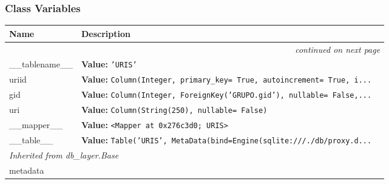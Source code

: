 
  \subsubsection{Class Variables}

    \vspace{-1cm}
\hspace{\varindent}\begin{longtable}{|p{\varnamewidth}|p{\vardescrwidth}|l}
\cline{1-2}
\cline{1-2} \centering \textbf{Name} & \centering \textbf{Description}& \\
\cline{1-2}
\endhead\cline{1-2}\multicolumn{3}{r}{\small\textit{continued on next page}}\\\endfoot\cline{1-2}
\endlastfoot\raggedright \_\-\_\-t\-a\-b\-l\-e\-n\-a\-m\-e\-\_\-\_\- & \raggedright \textbf{Value:} 
{\tt \texttt{'}\texttt{URIS}\texttt{'}}&\\
\cline{1-2}
\raggedright u\-r\-i\-i\-d\- & \raggedright \textbf{Value:} 
{\tt Column(Integer, primary\_key= True, autoincrement= True, i\texttt{...}}&\\
\cline{1-2}
\raggedright g\-i\-d\- & \raggedright \textbf{Value:} 
{\tt Column(Integer, ForeignKey('GRUPO.gid'), nullable= False,\texttt{...}}&\\
\cline{1-2}
\raggedright u\-r\-i\- & \raggedright \textbf{Value:} 
{\tt Column(String(250), nullable= False)}&\\
\cline{1-2}
\raggedright \_\-\_\-m\-a\-p\-p\-e\-r\-\_\-\_\- & \raggedright \textbf{Value:} 
{\tt {\textless}Mapper at 0x276c3d0; URIS{\textgreater}}&\\
\cline{1-2}
\raggedright \_\-\_\-t\-a\-b\-l\-e\-\_\-\_\- & \raggedright \textbf{Value:} 
{\tt Table('URIS', MetaData(bind=Engine(sqlite:///./db/proxy.d\texttt{...}}&\\
\cline{1-2}
\multicolumn{2}{|l|}{\textit{Inherited from db\_layer.Base}}\\
\multicolumn{2}{|p{\varwidth}|}{\raggedright metadata}\\
\cline{1-2}
\end{longtable}




